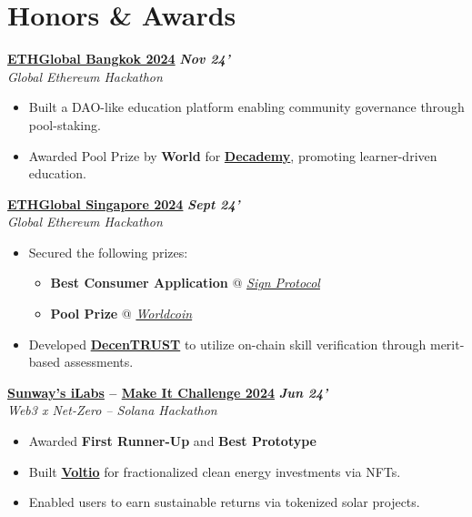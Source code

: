 \documentclass[letterpaper,10pt]{article}
\newcommand{\heading}[2]{
  \hspace{4pt}#1\hfill#2\\
}
\newcommand{\headingBf}[2]{
  \heading{\textbf{#1}}{
    \textbf{\textit{\small{#2}}}
  }
}
\newenvironment{bulletList}{
  \begin{itemize}[itemsep=1pt, parsep=1pt, leftmargin=26pt]
}{
  \end{itemize}
}
\newcommand{\oneFrag}[4]{
  \headingBf{#1}{#2}
  \hspace{6pt}\textit{#3}
  \vspace{-4pt}
  #4
}
\newenvironment{nestedBulletList}{
  \begin{itemize}[itemsep=1pt, parsep=1pt, leftmargin=14pt]
}{
  \end{itemize}
}
\begin{document}
\section{Honors \& Awards}

\vspace{2pt}
\oneFrag{
  \href{https://ethglobal.com/events/bangkok}{ETHGlobal Bangkok 2024}
}{
  Nov 24'
}{
  Global Ethereum Hackathon
}{
  \begin{bulletList}
    \item Built a DAO-like education platform enabling community governance through pool-staking.
    \item Awarded Pool Prize by \textbf{World} for \textbf{\href{https://ethglobal.com/showcase/decademy-8g59p}{Decademy}}, promoting learner-driven education.
  \end{bulletList}
}

\vspace{2pt}
\oneFrag{
  \href{https://ethglobal.com/events/singapore2024}{ETHGlobal Singapore 2024}
}{
  Sept 24'
}{
  Global Ethereum Hackathon
}{
  \begin{bulletList}
    \item Secured the following prizes:
    \vspace{-4pt}
    \begin{nestedBulletList}
      \item \textbf{Best Consumer Application} @ \textit{\href{https://sign.global}{Sign Protocol}}
      \item \textbf{Pool Prize} @ \textit{\href{https://worldcoin.org}{Worldcoin}}
    \end{nestedBulletList}
    \item Developed \textbf{\href{https://ethglobal.com/showcase/decentrust-vwp81}{DecenTRUST}} to utilize on-chain skill verification through merit-based assessments.
  \end{bulletList}
}

\vspace{2pt}
\oneFrag{
  \href{https://innovationlabs.sunway.edu.my}{Sunway's iLabs} -- \href{https://x.com/SuperteamMY/status/1815758624716931379}{Make It Challenge 2024}
}{
  Jun 24'
}{
  Web3 x Net-Zero -- Solana Hackathon
}{
  \begin{bulletList}
    \item Awarded \textbf{First Runner-Up} and \textbf{Best Prototype}
    \item Built \textbf{\href{https://github.com/eesuhn/voltio}{Voltio}} for fractionalized clean energy investments via NFTs.
    \item Enabled users to earn sustainable returns via tokenized solar projects.
  \end{bulletList}
}
\end{document}
